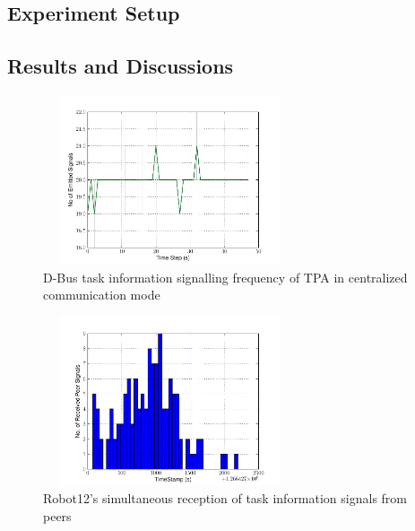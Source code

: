 \documentclass{ifacconf}
\begin{document}
\subsection{Experiment Setup}


\subsection{Results and Discussions}
\begin{figure}
\begin{center}
\includegraphics[width=7.5cm,height=5cm]{./images/Global-SignalingFreqStat}    %
\caption{D-Bus task information signalling frequency of TPA in centralized communication mode} 
\label{fig:global-freq}
\end{center}
\end{figure}
\begin{figure}
\begin{center}
\includegraphics[width=7.5cm,height=5cm]{./images/Robot12-17feb-3-LocalSignals}
\caption{Robot12's simultaneous reception of task information signals from peers} 
\label{fig:robot-freq}
\end{center}
\end{figure}
\end{document}
